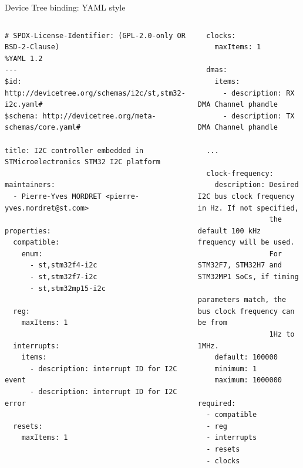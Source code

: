 \begin{frame}[fragile]{Device Tree binding: YAML style}
  \begin{columns}[t]
    \begin{block}{}
      {\fontsize{5}{6}\selectfont
\begin{verbatim}
# SPDX-License-Identifier: (GPL-2.0-only OR BSD-2-Clause)
%YAML 1.2
---
$id: http://devicetree.org/schemas/i2c/st,stm32-i2c.yaml#
$schema: http://devicetree.org/meta-schemas/core.yaml#

title: I2C controller embedded in STMicroelectronics STM32 I2C platform

maintainers:
  - Pierre-Yves MORDRET <pierre-yves.mordret@st.com>

properties:
  compatible:
    enum:
      - st,stm32f4-i2c
      - st,stm32f7-i2c
      - st,stm32mp15-i2c

  reg:
    maxItems: 1

  interrupts:
    items:
      - description: interrupt ID for I2C event
      - description: interrupt ID for I2C error

  resets:
    maxItems: 1

\end{verbatim}
      }
    \end{block}
    \begin{block}{}
      {\fontsize{5}{6}\selectfont
\begin{verbatim}
  clocks:
    maxItems: 1

  dmas:
    items:
      - description: RX DMA Channel phandle
      - description: TX DMA Channel phandle

  ...

  clock-frequency:
    description: Desired I2C bus clock frequency in Hz. If not specified,
                 the default 100 kHz frequency will be used.
                 For STM32F7, STM32H7 and STM32MP1 SoCs, if timing
                 parameters match, the bus clock frequency can be from
                 1Hz to 1MHz.
    default: 100000
    minimum: 1
    maximum: 1000000

required:
  - compatible
  - reg
  - interrupts
  - resets
  - clocks
\end{verbatim}
      }
    \end{block}
  \end{columns}
\end{frame}

